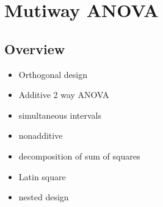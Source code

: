 \documentclass[11pt,fleqn]{book} %
\begin{document}
















\chapter{Mutiway ANOVA}

\section{Overview}

\begin{itemize}
	\item Orthogonal design
	\item Additive 2 way ANOVA
	\item simultaneous intervals
	\item nonadditive
	\item decomposition of sum of squares
	\item Latin square
	\item nested design
\end{itemize}
\end{document}
